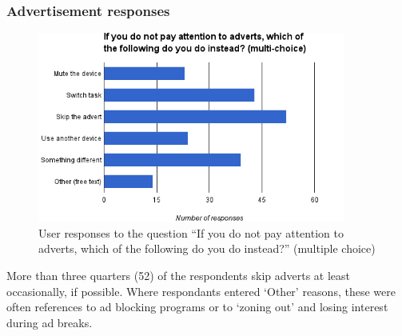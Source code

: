 \subsubsection{Advertisement responses}
\label{sec:prestudy_alternatives}
\begin{figure}[H]
	\vspace{-10pt}
	\includegraphics[width=0.9\textwidth, clip=true, trim=0 0 0 55pt]{images/prestudy_alternatives.png}
	\caption{User responses to the question ``If you do not pay attention to adverts, which of the following do you do instead?'' (multiple choice)}
	\label{fig:prestudy_alternatives}
	\vspace{-25pt}
\end{figure}
More than three quarters (52) of the respondents skip adverts at least occasionally, if possible. Where respondants entered `Other' reasons, these were often references to ad blocking programs or to `zoning out' and losing interest during ad breaks.

